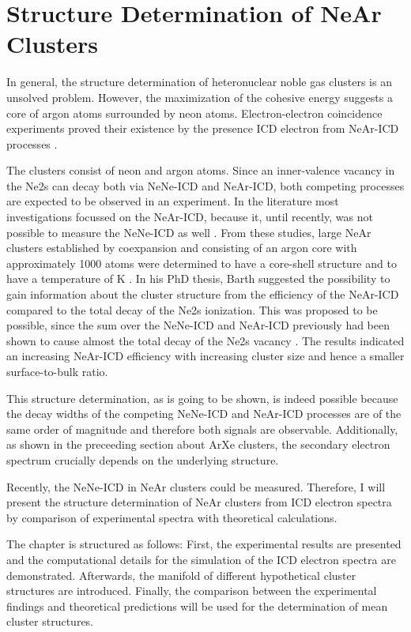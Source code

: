 \section{Structure Determination of NeAr Clusters}

In general, the structure determination of heteronuclear noble gas
clusters is an unsolved problem. However, the maximization of the cohesive
energy suggests a core of argon atoms surrounded by neon atoms.
Electron-electron coincidence experiments proved their existence by the
presence ICD electron from NeAr-ICD processes \cite{Lundwall07}.

The clusters consist of neon and argon atoms. Since an inner-valence vacancy in
the Ne2s can decay both via NeNe-ICD and NeAr-ICD, both competing processes
are expected to be observed in an experiment. In the literature most
investigations focussed on the NeAr-ICD, because it, until recently, was not
possible to measure the NeNe-ICD as well \cite{Fasshauer14_1}.
From these studies, large NeAr clusters established by coexpansion and
consisting of an argon core with
approximately 1000 atoms were determined to have a core-shell structure
\cite{Lundwall07,Barth_diss}
and to have a temperature of \unit[40 -- 50]{K} \cite{Barth_diss}.
In his PhD thesis, Barth suggested the possibility to gain information about
the cluster structure from the efficiency of the NeAr-ICD compared to the
total decay of the Ne2s ionization. This was proposed to be possible, since
the sum over the NeNe-ICD and NeAr-ICD previously had been shown to
cause almost the total decay of the Ne2s vacancy \cite{Marburger_diss}.
The results indicated an increasing NeAr-ICD efficiency with increasing
cluster size and hence a smaller surface-to-bulk ratio.

This structure determination, as is going to be shown, is indeed possible
because the decay widths of the competing NeNe-ICD and NeAr-ICD processes
are of the same order
of magnitude and therefore both signals are observable. Additionally, as shown
in the preceeding section about ArXe clusters, the secondary electron spectrum
crucially depends on the underlying structure.

Recently, the NeNe-ICD in NeAr clusters could be measured. Therefore, I will
present the structure determination of NeAr clusters from ICD electron
spectra by comparison of experimental spectra with theoretical calculations.

The chapter is structured as follows: First, the experimental results are
presented and the computational details for the simulation of the ICD
electron spectra are demonstrated. Afterwards, the manifold of different 
hypothetical cluster structures are introduced. Finally, the comparison
between the experimental findings and theoretical predictions will be used
for the determination of mean cluster structures.


